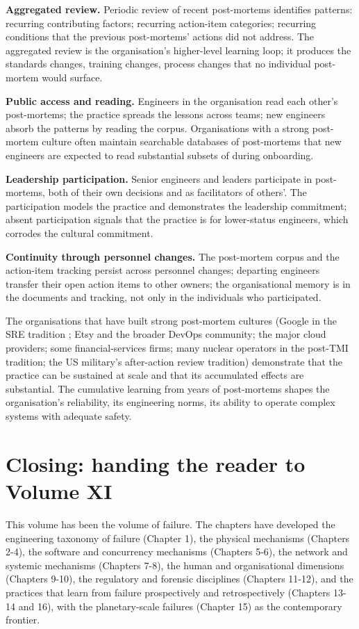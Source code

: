 \textbf{Aggregated review.} Periodic review of recent post-mortems identifies patterns: recurring contributing factors; recurring action-item categories; recurring conditions that the previous post-mortems' actions did not address. The aggregated review is the organisation's higher-level learning loop; it produces the standards changes, training changes, process changes that no individual post-mortem would surface.

\textbf{Public access and reading.} Engineers in the organisation read each other's post-mortems; the practice spreads the lessons across teams; new engineers absorb the patterns by reading the corpus. Organisations with a strong post-mortem culture often maintain searchable databases of post-mortems that new engineers are expected to read substantial subsets of during onboarding.

\textbf{Leadership participation.} Senior engineers and leaders participate in post-mortems, both of their own decisions and as facilitators of others'. The participation models the practice and demonstrates the leadership commitment; absent participation signals that the practice is for lower-status engineers, which corrodes the cultural commitment.

\textbf{Continuity through personnel changes.} The post-mortem corpus and the action-item tracking persist across personnel changes; departing engineers transfer their open action items to other owners; the organisational memory is in the documents and tracking, not only in the individuals who participated.

The organisations that have built strong post-mortem cultures (Google in the SRE tradition \cite{text:google-sre}; Etsy and the broader DevOps community; the major cloud providers; some financial-services firms; many nuclear operators in the post-TMI tradition; the US military's after-action review tradition) demonstrate that the practice can be sustained at scale and that its accumulated effects are substantial. The cumulative learning from years of post-mortems shapes the organisation's reliability, its engineering norms, its ability to operate complex systems with adequate safety.

\section{Closing: handing the reader to Volume XI}

This volume has been the volume of failure. The chapters have developed the engineering taxonomy of failure (Chapter 1), the physical mechanisms (Chapters 2-4), the software and concurrency mechanisms (Chapters 5-6), the network and systemic mechanisms (Chapters 7-8), the human and organisational dimensions (Chapters 9-10), the regulatory and forensic disciplines (Chapters 11-12), and the practices that learn from failure prospectively and retrospectively (Chapters 13-14 and 16), with the planetary-scale failures (Chapter 15) as the contemporary frontier.

